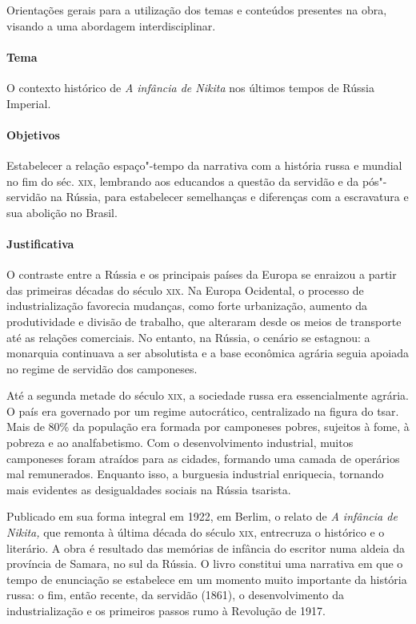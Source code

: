 \documentclass[11pt]{extarticle}
\begin{document}
Orientações gerais para a utilização dos temas e conteúdos
presentes na obra, visando a uma abordagem interdisciplinar.

\paragraph{Tema} O contexto histórico de \emph{A infância de Nikita} nos últimos tempos de Rússia Imperial.


\paragraph{Objetivos}
Estabelecer a relação espaço"-tempo da narrativa com a história russa e
mundial no fim do séc. \textsc{xix}, lembrando aos educandos a questão da
servidão e da pós"-servidão na Rússia, para estabelecer semelhanças e
diferenças com a escravatura e sua abolição no Brasil.

\paragraph{Justificativa}
O contraste entre a Rússia e os principais países da Europa se enraizou
a partir das primeiras décadas do século \textsc{xix}. Na Europa Ocidental, o
processo de industrialização favorecia mudanças, como forte urbanização,
aumento da produtividade e divisão de trabalho, que alteraram desde os
meios de transporte até as relações comerciais. No entanto, na Rússia, o
cenário se estagnou: a monarquia continuava a ser absolutista e a base
econômica agrária seguia apoiada no regime de servidão dos camponeses.

Até a segunda metade do século \textsc{xix}, a sociedade russa era essencialmente
agrária. O país era governado por um regime autocrático, centralizado na
figura do tsar. Mais de 80\% da população era formada por camponeses
pobres, sujeitos à fome, à pobreza e ao analfabetismo. Com o
desenvolvimento industrial, muitos camponeses foram atraídos para as
cidades, formando uma camada de operários mal remunerados. Enquanto
isso, a burguesia industrial enriquecia, tornando mais evidentes as
desigualdades sociais na Rússia tsarista.

Publicado em sua forma integral em 1922, em Berlim, o relato de \emph{A
infância de Nikita,} que remonta à última década do século \textsc{xix},
entrecruza o histórico e o literário. A obra é resultado das memórias de
infância do escritor numa aldeia da província de Samara, no sul da Rússia. O livro constitui
uma narrativa em que o tempo de enunciação se estabelece em um momento
muito importante da história russa: o fim, então recente, da servidão
(1861), o desenvolvimento da industrialização e os primeiros passos rumo
à Revolução de 1917.
\end{document}
